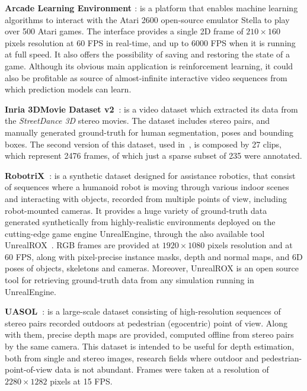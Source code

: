 \vspace*{0.1cm}\noindent\textbf{Arcade Learning Environment \cite{Bellemare2013}}: is a platform that enables machine learning algorithms to interact with the Atari \num{2600} open-source emulator Stella to play over \num{500} Atari games. The interface provides a single 2D frame of $210 \times 160$ pixels resolution at \num{60} \ac{FPS} in real-time, and up to \num{6000} \ac{FPS} when it is running at full speed. It also offers the possibility of saving and restoring the state of a game. Although its obvious main application is reinforcement learning, it could also be profitable as source of almost-infinite interactive video sequences from which prediction models can learn.

\vspace*{0.1cm}\noindent\textbf{Inria 3DMovie Dataset v2~\cite{Seguin2016}}: is a video dataset which extracted its data from the \textit{StreetDance 3D} stereo movies. The dataset includes stereo pairs, and manually generated ground-truth for human segmentation, poses and bounding boxes. The second version of this dataset, used in~\cite{Seguin2016}, is composed by \num{27} clips, which represent \num{2476} frames, of which just a sparse subset of \num{235} were annotated.

\vspace*{0.1cm}\noindent\textbf{RobotriX~\cite{Garcia2018b}}: is a synthetic dataset designed for assistance robotics, that consist of sequences where a humanoid robot is moving through various indoor scenes and interacting with objects, recorded from multiple points of view, including robot-mounted cameras. It provides a huge variety of ground-truth data generated synthetically from highly-realistic environments deployed on the cutting-edge game engine UnrealEngine, through the also available tool UnrealROX~\cite{Martinez2019}. RGB frames are provided at $1920 \times 1080$ pixels resolution and at \num{60} \ac{FPS}, along with pixel-precise instance masks, depth and normal maps, and 6D poses of objects, skeletons and cameras. Moreover, UnrealROX is an open source tool for retrieving ground-truth data from any simulation running in UnrealEngine.

\vspace*{0.1cm}\noindent\textbf{UASOL~\cite{Bauer2019}}: is a large-scale dataset consisting of high-resolution sequences of stereo pairs recorded outdoors at pedestrian (egocentric) point of view. Along with them, precise depth maps are provided, computed offline from stereo pairs by the same camera. This dataset is intended to be useful for depth estimation, both from single and stereo images, research fields where outdoor and pedestrian-point-of-view data is not abundant. Frames were taken at a resolution of $2280 \times 1282$ pixels at \num{15} \ac{FPS}.


